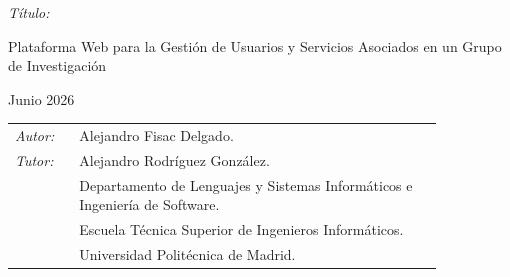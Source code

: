 \begin{titlepage}
\begin{minipage}[t]{0.1\linewidth}
  \textit{Título:}
\end{minipage}
\begin{minipage}[t]{0.88\linewidth}
Plataforma Web para la Gestión de Usuarios y Servicios Asociados en un Grupo de Investigación
\end{minipage}

Junio 2026

\vspace*{4cm}

\noindent
\begin{tabular}{lp{0.85\linewidth}}
  \textit{Autor:} & Alejandro Fisac Delgado.  \\
  \textit{Tutor:} & Alejandro Rodríguez González.  \\
                  & Departamento de Lenguajes y Sistemas Informáticos e Ingeniería de Software. \\
                  & Escuela Técnica Superior de Ingenieros Informáticos.\\
                  & Universidad Politécnica de Madrid.
\end{tabular}

\end{titlepage}

